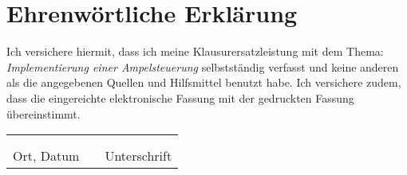 \chapter*{Ehrenwörtliche Erklärung}

Ich versichere hiermit, dass ich meine Klausurersatzleistung mit dem Thema: \textit{Implementierung einer Ampelsteuerung} selbstständig verfasst und keine anderen als die angegebenen Quellen und Hilfsmittel benutzt habe. Ich versichere zudem, dass die eingereichte elektronische Fassung mit der gedruckten Fassung übereinstimmt.


\vspace{2cm}




\begin{table}[H]
	\begin{tabular}{lll}
		&        &                           \\
		&        &                           \\ \cline{1-1} \cline{3-3} 
		 Ort, Datum\hspace{2cm} & \hspace{5cm} & Unterschrift \hspace{2cm}
	\end{tabular}
\end{table}
